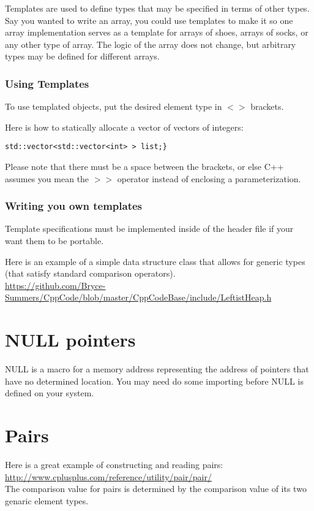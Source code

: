 \documentclass[12pt, letterpaper]{article}
\begin{document}
Templates are used to define types that may be specified in terms of other types. Say you wanted to write an array, you could use templates to make it so one array implementation serves as a template for arrays of shoes, arrays of socks, or any other type of array. The logic of the array does not change, but arbitrary types may be defined for different arrays.

\subsubsection{Using Templates}

To use templated objects, put the desired element type in $<>$ brackets.

Here is how to statically allocate a vector of vectors of integers:

\begin{verbatim}
std::vector<std::vector<int> > list;}
\end{verbatim}
Please note that there must be a space between the brackets, or else C++ assumes you mean the $>>$ operator instead of enclosing a parameterization.

\subsubsection{Writing you own templates}
Template specifications must be implemented inside of the header file if your want them to be portable.

Here is an example of a simple data structure class that allows for generic types (that satisfy standard comparison operators).\\
\href{https://github.com/Bryce-Summers/CppCode/blob/master/CppCodeBase/include/LeftistHeap.h}{https://github.com/Bryce-Summers/CppCode/blob/master/CppCodeBase/include/LeftistHeap.h}

\section{NULL pointers}

NULL is a macro for a memory address representing the address of pointers that have no determined location. You may need do some importing before NULL is defined on your system.

\section{Pairs}
Here is a great example of constructing and reading pairs:\\

\href{http://www.cplusplus.com/reference/utility/pair/pair/}{http://www.cplusplus.com/reference/utility/pair/pair/}\\

The comparison value for pairs is determined by the comparison value of its two genaric element types.
\end{document}
